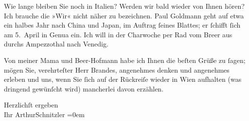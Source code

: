 \pstart
           Wie lange bleiben Sie noch in Italien? Werden
               wir bald wieder von {\pb}Ihnen hören? Ich brauche die
               »Wir« nicht näher zu bezeichnen. Paul Goldmann
               geht auf etwa ein halbes Jahr nach China und Japan, im Auftrag{ }ſeines Blattes; er{ }ſchifft{ }ſich am
                  5. April in Genua ein. Ich will
               in der Charwoche per Rad vom Bre{\geminationn}er aus durchs Ampezzothal
               nach Venedig.\pend
           
\pstart
           Von meiner Mama und Beer-Hofmann habe ich Ihnen die beſten Grüße zu{ }ſagen; {\pb}mögen Sie, verehrteſter Herr Brandes,
               angenehmes denken und angenehmes erleben und uns, wenn Sie{ }ſich auf der Rückreiſe
               wieder in Wien aufhalten (was dringend gewünſcht
               wird) mancherlei davon erzählen.\pend
           
\pstart
           Herzlichſt ergeben{\\[\baselineskip]}Ihr \spacefill\mbox{ArthurSchnitzler}\pend
           \leftskip=0em{}\endnumbering{}  \newcommand{\dateiname}{L00787}\newcommand{\titel}{Arthur Schnitzler an Georg Brandes, 27. 3. 1898}\newcommand{\editorInnen}{Martin Anton Müller und Gerd-Hermann Susen}
